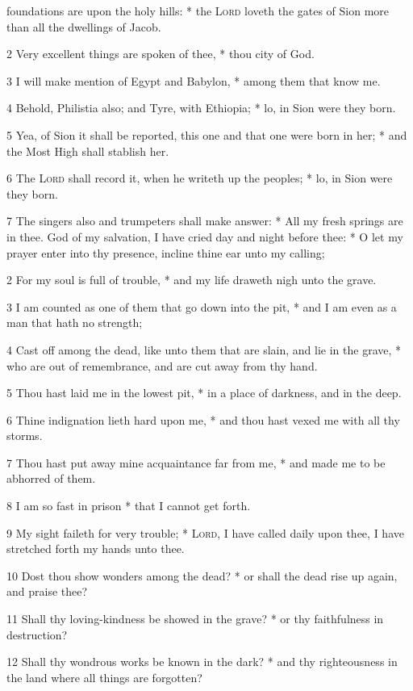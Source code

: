  foundations are upon the holy hills: * the {\textsc{Lord}} loveth the gates of Sion more than all the dwellings of Jacob.\par
2 Very excellent things are spoken of thee, * thou city of God.\par
3 I will make mention of Egypt and Babylon, * among them that know me.\par
4 Behold, Philistia also; and Tyre, with Ethiopia; * lo, in Sion were they born.\par
5 Yea, of Sion it shall be reported, this one and that one were born in her; * and the Most High shall stablish her.\par
6 The {\textsc{Lord}} shall record it, when he writeth up the peoples; * lo, in Sion were they born.\par
7 The singers also and trumpeters shall make answer: * All my fresh springs are in thee.
 God of my salvation, I have cried day and night before thee: * O let my prayer enter into thy presence, incline thine ear unto my calling;\par
2 For my soul is full of trouble, * and my life draweth nigh unto the grave.\par
3 I am counted as one of them that go down into the pit, * and I am even as a man that hath no strength;\par
4 Cast off among the dead, like unto them that are slain, and lie in the grave, * who are out of remembrance, and are cut away from thy hand.\par
5 Thou hast laid me in the lowest pit, * in a place of darkness, and in the deep.\par
6 Thine indignation lieth hard upon me, * and thou hast vexed me with all thy storms.\par
7 Thou hast put away mine acquaintance far from me, * and made me to be abhorred of them.\par
8 I am so fast in prison * that I cannot get forth.\par
9 My sight faileth for very trouble; * {\textsc{Lord}}, I have called daily upon thee, I have stretched forth my hands unto thee.\par
10 Dost thou show wonders among the dead? * or shall the dead rise up again, and praise thee?\par
11 Shall thy loving-kindness be showed in the grave? * or thy faithfulness in destruction?\par
12 Shall thy wondrous works be known in the dark? * and thy righteousness in the land where all things are forgotten?\par
